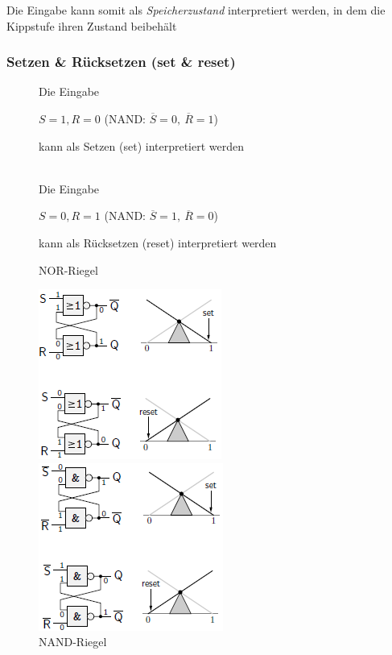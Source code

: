 \documentclass[12pt]{report}
\begin{document}
Die Eingabe kann somit als \textit{Speicherzustand} interpretiert werden, 
in dem die Kippstufe ihren Zustand beibehält

\subsubsection{Setzen \& Rücksetzen (set \& reset)}

\begin{figure}[H]
  \begin{minipage}[t]{0.45\textwidth}
    \centering
    Die Eingabe
    
    $S=1, R=0$ (NAND: $\overline{S} = 0,\ \overline{R} = 1$)
    
    kann als Setzen (set) interpretiert werden \\ \ 
  \end{minipage}
  \hfill
  \begin{minipage}[t]{0.45\textwidth}
    \centering
    Die Eingabe 
    
    $S=0, R=1$ (NAND: $\overline{S} = 1,\ \overline{R} = 0$) 
    
    kann als Rücksetzen (reset) interpretiert werden
  \end{minipage}
\end{figure}


\begin{figure}[H]
  \begin{minipage}[t]{0.48\textwidth}
    \caption{NOR-Riegel}
    \centering
    \includegraphics{riegel_nor_set_reset}
  \end{minipage}
  \hfill
  \begin{minipage}[t]{0.48\textwidth}
    \caption{NAND-Riegel}
    \centering
    \includegraphics{riegel_nand_set_reset}
  \end{minipage}
\end{figure}
\end{document}
